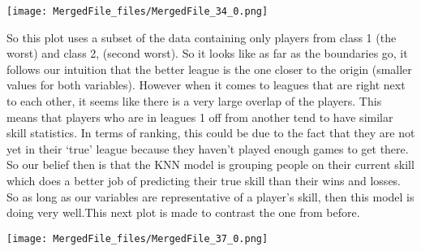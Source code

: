 \documentclass[letterpaper,10pt,english]{/usr/share/sphinx/texinputs/sphinxhowto}
\newenvironment{InvisibleVerbatim}
        {\begin{mdframed}[leftmargin=0.1\linewidth,innerleftmargin=3pt,innerrightmargin=3pt, userdefinedwidth=1\linewidth, linewidth=0pt, linecolor=white, usetwoside=false]}
        {\end{mdframed}}
\begin{document}
    

        
        

            
                \begin{InvisibleVerbatim}
                \vspace{-0.5\baselineskip}
    \begin{center}
    \texttt{[image: MergedFile\_files/MergedFile\_34\_0.png]}
    \par
    \end{center}
    
            \end{InvisibleVerbatim}
            
        
    
So this plot uses a subset of the data containing only players from
class 1 (the worst) and class 2, (second worst). So it looks like as far
as the boundaries go, it follows our intuition that the better league is
the one closer to the origin (smaller values for both variables).
However when it comes to leagues that are right next to each other, it
seems like there is a very large overlap of the players. This means that
players who are in leagues 1 off from another tend to have similar skill
statistics. In terms of ranking, this could be due to the fact that they
are not yet in their `true' league because they haven't played enough
games to get there. So our belief then is that the KNN model is grouping
people on their current skill which does a better job of predicting
their true skill than their wins and losses. So as long as our variables
are representative of a player's skill, then this model is doing very
well.This next plot is made to contrast the one from before.

    

        
        

            
                \begin{InvisibleVerbatim}
                \vspace{-0.5\baselineskip}
    \begin{center}
    \texttt{[image: MergedFile\_files/MergedFile\_37\_0.png]}
    \par
    \end{center}
    
            \end{InvisibleVerbatim}
            
\end{document}
